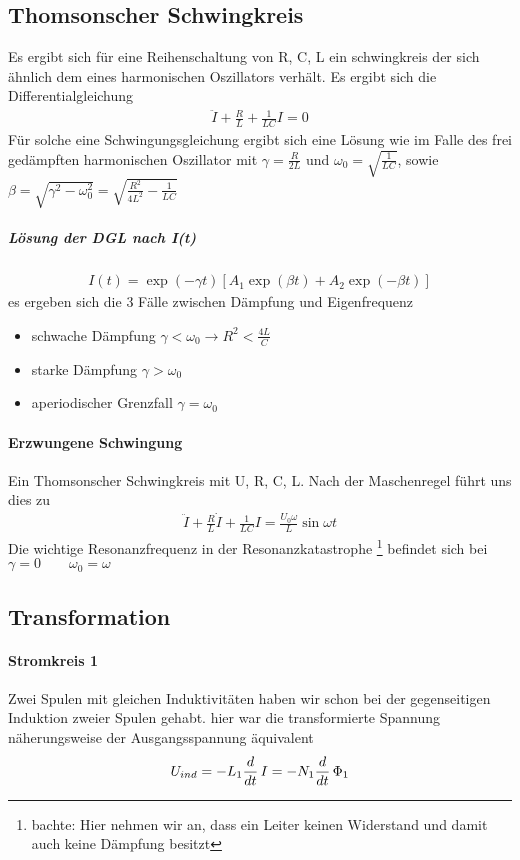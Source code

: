 \subsection{Thomsonscher Schwingkreis}
Es ergibt sich für eine Reihenschaltung von R, C, L ein schwingkreis der sich ähnlich dem eines harmonischen Oszillators verhält.
Es ergibt sich die Differentialgleichung
\begin{align} \label{eqn:ThomsonDGL}
\ddot{I} + \frac{R}{L} + \frac{1}{LC}I = 0
\end{align}
Für solche eine Schwingungsgleichung ergibt sich eine Lösung wie im Falle des frei gedämpften harmonischen Oszillator mit $\gamma = \frac{R}{2L}$ und $\omega_0 = \sqrt{\frac{1}{LC}} $, sowie $\beta = \sqrt{\gamma^2 - \omega_0^2} = \sqrt{\frac{R^2}{4L^2} - \frac{1}{LC}}$
\subparagraph{Lösung der DGL nach I(t)}
\begin{align} \label{eqn:ThomsonDGLLoes}
I(t) = \exp \left(- \gamma t \right) \left[  A_1 \exp ( \beta t) + A_2 \exp (- \beta t)        \right]
\end{align}
es ergeben sich die 3 Fälle zwischen Dämpfung und Eigenfrequenz 
\begin{itemize}
\item schwache Dämpfung $\gamma < \omega_0 \rightarrow R^2 < \frac{4L}{C}$
\item starke Dämpfung $\gamma > \omega_0$
\item aperiodischer Grenzfall $\gamma = \omega_0$
\end{itemize}

\paragraph{Erzwungene Schwingung}
Ein Thomsonscher Schwingkreis mit U, R, C, L. Nach der Maschenregel führt uns dies zu
\begin{align} \label{eqn:gezThomsonDGL}
\boxed{\ddot{I} + \frac{R}{L} \dot{I} + \frac{1}{LC} I = \frac{U_0 \omega}{L} \sin \omega t}
\end{align}
Die wichtige Resonanzfrequenz in der Resonanzkatastrophe \footnote{bachte: Hier nehmen wir an, dass ein Leiter keinen Widerstand und damit auch keine Dämpfung besitzt} befindet sich bei $\gamma = 0 \qquad \omega_0 = \omega$

\subsection{Transformation}
\paragraph{Stromkreis 1}
Zwei Spulen mit gleichen Induktivitäten haben wir schon bei der gegenseitigen Induktion zweier Spulen gehabt. hier war die transformierte Spannung näherungsweise der Ausgangsspannung äquivalent
\begin{align} \label{eqn:Trafo_Strom1}
U_{ind} = - L_1 \frac{d }{dt} \,  I = - N_1 \frac{d }{dt} \,  \Phi_1 
\end{align}
